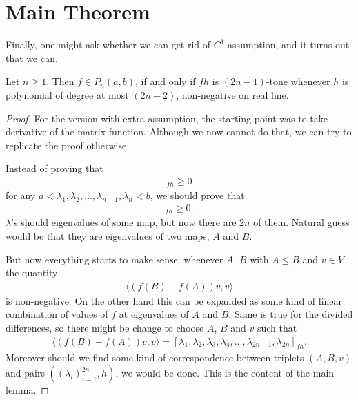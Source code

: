 \section{Main Theorem}

Finally, one might ask whether we can get rid of $C^{1}$-assumption, and it turns out that we can.

\begin{lause}
	Let $n \geq 1$. Then $f \in P_{n}(a, b)$, if and only if $f h$ is $(2 n - 1)$-tone whenever $h$ is polynomial of degree at most $(2 n - 2)$, non-negative on real line. 
\end{lause}
\begin{proof}
	For the version with extra assumption, the starting point was to take derivative of the matrix function. Although we now cannot do that, we can try to replicate the proof otherwise.

	Instead of proving that
	\begin{align*}
		[\lambda_{1}, \lambda_{1}, \lambda_{2}, \lambda_{2}, \ldots, \lambda_{n}, \lambda_{n}]_{f h} \geq 0
	\end{align*}
	for any $a < \lambda_{1}, \lambda_{2}, \ldots, \lambda_{n - 1}, \lambda_{n} < b$, we should prove that
	\begin{align*}
		[\lambda_{1}, \lambda_{2}, \lambda_{3}, \lambda_{4}, \ldots, \lambda_{2n - 1}, \lambda_{2 n}]_{f h} \geq 0.
	\end{align*}
	$\lambda$'s should eigenvalues of some map, but now there are $2 n$ of them. Natural guess would be that they are eigenvalues of two maps, $A$ and $B$.

	But now everything starts to make sense: whenever $A$, $B$ with $A \leq B$ and $v \in V$ the quantity
	\begin{align*}
		\langle (f(B) - f(A)) v, v \rangle
	\end{align*}
	is non-negative. On the other hand this can be expanded as some kind of linear combination of values of $f$ at eigenvalues of $A$ and $B$. Same is true for the divided differences, so there might be change to choose $A$, $B$ and $v$ such that
	\begin{align*}
		\langle (f(B) - f(A)) v, v \rangle = [\lambda_{1}, \lambda_{2}, \lambda_{3}, \lambda_{4}, \ldots, \lambda_{2n - 1}, \lambda_{2 n}]_{f h}.
	\end{align*}
	Moreover should we find some kind of correspondence between triplets $(A, B, v)$ and pairs $((\lambda_{i})_{i = 1}^{2 n}, h)$, we would be done. This is the content of the main lemma.


\end{proof}
